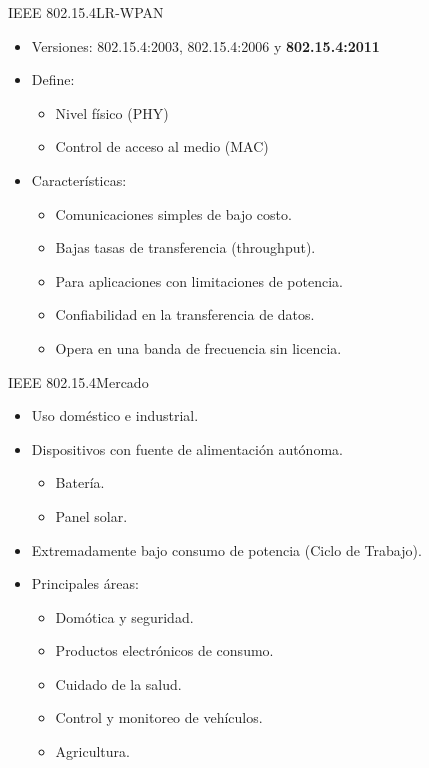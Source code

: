 \documentclass[aspectratio=169]{beamer}
\begin{document}
\begin{frame}{IEEE 802.15.4}{LR-WPAN}
	\begin{itemize}
		\item Versiones: 802.15.4:2003, 802.15.4:2006 y \textbf{802.15.4:2011}
		\vspace{5px}
		\item Define:
		\begin{itemize}
			\item Nivel físico (PHY)
			\item Control de acceso al medio (MAC)
		\end{itemize}
		\vspace{5px}
		\item Características:
		\begin{itemize}
			\item Comunicaciones simples de bajo costo. 
			\item Bajas tasas de transferencia (throughput).
			\item Para aplicaciones con limitaciones de potencia.
			\item Confiabilidad en la transferencia de datos.
			\item Opera en una banda de frecuencia sin licencia.
		\end{itemize}
	\end{itemize}
	
\end{frame}

\begin{frame}{IEEE 802.15.4}{Mercado}
	\begin{itemize}
		\item Uso doméstico e industrial.
		\vspace{5px}
		\item Dispositivos con fuente de alimentación autónoma.
		\begin{itemize}
			\item Batería.
			\item Panel solar.
		\end{itemize}
		\vspace{5px}
		\item Extremadamente bajo consumo de potencia (Ciclo de Trabajo).
		\vspace{5px}
		\item Principales áreas:
		\begin{itemize}
			\item Domótica y seguridad.
			\item Productos electrónicos de consumo.
			\item Cuidado de la salud.
			\item Control y monitoreo de vehículos.
			\item Agricultura.
		\end{itemize}
	\end{itemize}
	
\end{frame}
\end{document}
